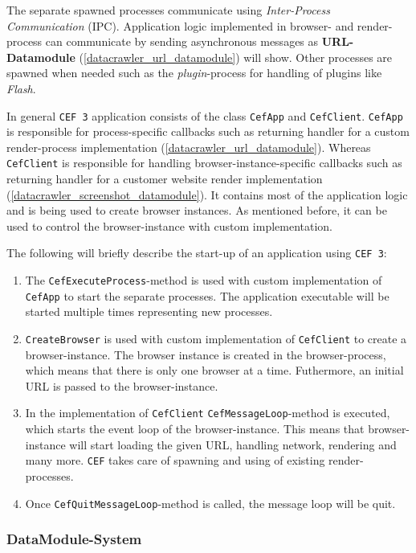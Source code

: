 The separate spawned processes communicate using \textit{Inter-Process Communication} (IPC). Application logic implemented in browser- and render-process can communicate by sending asynchronous messages as \textbf{URL-Datamodule} (\ref{datacrawler_url_datamodule})  will show. Other processes are spawned when needed such as the \textit{plugin}-process for handling of plugins like \textit{Flash}.

In general \texttt{CEF 3} application consists of the class \texttt{CefApp} and \texttt{CefClient}. \texttt{CefApp} is responsible for process-specific callbacks such as returning handler for a custom render-process implementation (\ref{datacrawler_url_datamodule}). Whereas \texttt{CefClient} is responsible for handling browser-instance-specific callbacks such as returning handler for a customer website render implementation (\ref{datacrawler_screenshot_datamodule}). It contains most of the application logic and is being used to create browser instances. As mentioned before, it can be used to control the browser-instance with custom implementation.

The following will briefly describe the start-up of an application using \texttt{CEF 3}:
\begin{enumerate}
	\item The \texttt{CefExecuteProcess}-method is used with custom implementation of \texttt{CefApp} to start the separate processes. The application executable will be started multiple times representing new processes.
	\item \texttt{CreateBrowser} is used with custom implementation of \texttt{CefClient} to create a browser-instance. The browser instance is created in the browser-process, which means that there is only one browser at a time. Futhermore, an initial URL is passed to the browser-instance.
	\item In the implementation of \texttt{CefClient} \texttt{CefMessageLoop}-method is executed, which starts the event loop of the browser-instance. This means that browser-instance will start loading the given URL, handling network, rendering and many more. \texttt{CEF} takes care of spawning and using of existing render-processes.
	\item Once \texttt{CefQuitMessageLoop}-method is called, the message loop will be quit.
\end{enumerate}

\subsubsection{DataModule-System}
\label{datacrawler_datamodulesystem}

